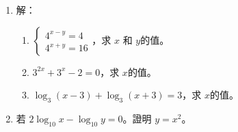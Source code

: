 \documentclass[11pt]{article}
\begin{document}
\begin{enumerate}
            \hrulefill
            
            \hrulefill
            
            \hrulefill

        \pagebreak
        \item 解：\begin{enumerate}
            \item $\displaystyle\begin{cases}
                4^{x-y}=4\\
                4^{x+y}=16
            \end{cases}$，求 $x$ 和 $y$的值。
            \item $3^{2x}+3^x-2=0$，求 $x$的值。
            \item $\log_3(x-3)+\log_3(x+3)=3$，求 $x$的值。
        \end{enumerate}

        \hrulefill
            
            \hrulefill
            
            \hrulefill
            
            \hrulefill
            
            \hrulefill

            \hrulefill
            
            \hrulefill
            
            \hrulefill
            
            \hrulefill
            
            \hrulefill
            
            \hrulefill
            
            \hrulefill

        \item 若 $2\log_{10}{x}-\log_{10}{y}=0$。證明 $y=x^2$。
            
            \hrulefill
            
            \hrulefill
            
            \hrulefill
            
            \hrulefill
            
            \hrulefill
            
            \hrulefill
            
            \hrulefill
            
            \hrulefill
            

\end{enumerate}
\end{document}
